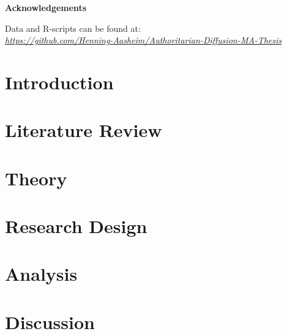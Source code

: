 \documentclass[12pt]{report} %
\begin{document}
\newpage

\begin{center}
    \large
    \textbf{Acknowledgements}
\end{center}

\newpage
\thispagestyle{empty}
\vspace*{\fill}
\begin{center}
    Data and R-scripts can be found at: \\
    \href{https://github.com/Henning-Aasheim/Authoritarian-Diffusion-MA-Thesis}{\textit{https://github.com/Henning-Aasheim/Authoritarian-Diffusion-MA-Thesis}}
\end{center}
\vspace*{\fill}

\newpage

\tableofcontents

\listoffigures

\listoftables

\chapter{Introduction} \label{chp:introduction}


\chapter{Literature Review} \label{chp:literature}


\chapter{Theory} \label{chp:theory}


\chapter{Research Design} \label{chp:research_design}


\chapter{Analysis} \label{chp:analysis}


\chapter{Discussion}
 \label{chp:discussion}
\end{document}
